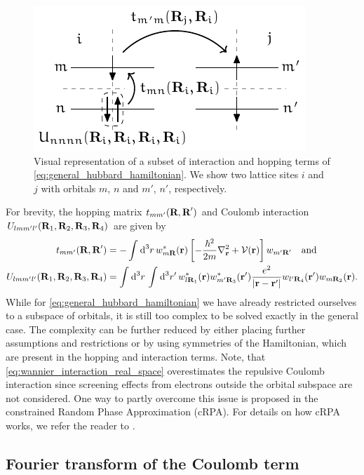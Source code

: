 \documentclass[../../main.tex]{subfiles}
\begin{document}
\begin{figure}[ht!]
	\centering
	\includegraphics[width=.45\textwidth]{../../Graphics/Diagrams/two_orbitals_two_sites_hopping/two_orbitals_two_sites_hopping.pdf}
	\caption{Visual representation of a subset of interaction and hopping terms of \eqref{eq:general_hubbard_hamiltonian}. We show two lattice sites $i$ and $j$ with orbitals $m$, $n$ and $m'$, $n'$, respectively.}
	\label{fig:two_orbitals_two_sites_hopping}
\end{figure}
For brevity, the hopping matrix $t_{mm'}(\textbf{R},\textbf{R}')$ and Coulomb interaction $U_{lmm'l'}(\textbf{R}_1,\textbf{R}_2,\textbf{R}_3,\textbf{R}_4)$ are given by
\begin{align}
	t_{mm'}(\textbf{R},\textbf{R}')&=-\int_{}^{}\text{d}^3r\,w^*_{m\textbf{R}}(\textbf{r})\left [-\frac{\hbar^2}{2m}\nabla^2_{\textbf{r}}+\mathcal{V}(\textbf{r})\right ]w_{m'\textbf{R}'}\quad\text{and}\\
	U_{lmm'l'}(\textbf{R}_1,\textbf{R}_2,\textbf{R}_3,\textbf{R}_4)&=\int_{}^{}\text{d}^3r\,\int_{}^{}\text{d}^3r'\,w^*_{l\textbf{R}_1}(\textbf{r})w^*_{m'\textbf{R}_3}(\textbf{r}')\frac{e^2}{|\textbf{r}-\textbf{r}'|}w_{l'\textbf{R}_4}(\textbf{r}')w_{m\textbf{R}_2}(\textbf{r}).\label{eq:wannier_interaction_real_space}
\end{align}
While for \eqref{eq:general_hubbard_hamiltonian} we have already restricted ourselves to a subspace of orbitals, it is still too complex to be solved exactly in the general case. The complexity can be further reduced by either placing further assumptions and restrictions or by using symmetries of the Hamiltonian, which are present in the hopping and interaction terms. Note, that \eqref{eq:wannier_interaction_real_space} overestimates the repulsive Coulomb interaction since screening effects from electrons outside the orbital subspace are not considered. One way to partly overcome this issue is proposed in the constrained Random Phase Approximation (cRPA). For details on how cRPA works, we refer the reader to \cite{crpa reference from somewhere}. 

\subsection{Fourier transform of the Coulomb term}
\end{document}
